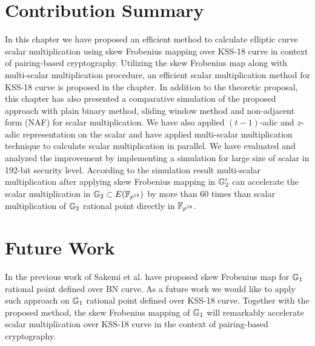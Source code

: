 \section{Contribution Summary}
In this chapter we have proposed an efficient method to calculate elliptic curve scalar multiplication using skew Frobenius mapping  over KSS-18 curve in context of pairing-based cryptography. 
Utilizing the skew Frobenius map along with multi-scalar multiplication procedure, an efficient scalar multiplication method for KSS-18 curve is proposed in the chapter.
In addition to the theoretic proposal, this chapter has also presented a comparative simulation of the proposed approach with plain binary method, sliding window method and non-adjacent form (NAF) for scalar multiplication. 
We have also applied $(t-1)$-adic and $z$-adic representation on the scalar and have applied multi-scalar multiplication technique to  calculate scalar multiplication in parallel. 
We have evaluated and analyzed the improvement by implementing a simulation for large size of scalar in 192-bit security level. 
According to the simulation result multi-scalar multiplication after applying skew Frobenius mapping in ${\mathbb{G}}_{2}'$ can accelerate the scalar multiplication in ${\mathbb{G}}_{2} \subset E(\mathbb{F}_{p^{18}})$ by more than 60 times than scalar multiplication of ${\mathbb{G}}_{2}$ rational point directly in $\mathbb{F}_{p^{18}}$. 

\section{Future Work}

In the previous work of Sakemi et al. \cite{CANS:SNOKM08} have proposed skew Frobenius map for ${\mathbb{G}}_{1}$ rational point defined over BN curve. 
As a future work we would like to apply such approach on ${\mathbb{G}}_{1}$ rational point defined over KSS-18 curve.
Together with the proposed method, the skew Frobenius mapping of ${\mathbb{G}}_{1}$ will remarkably accelerate scalar multiplication over KSS-18 curve in the context of pairing-based cryptography. 
